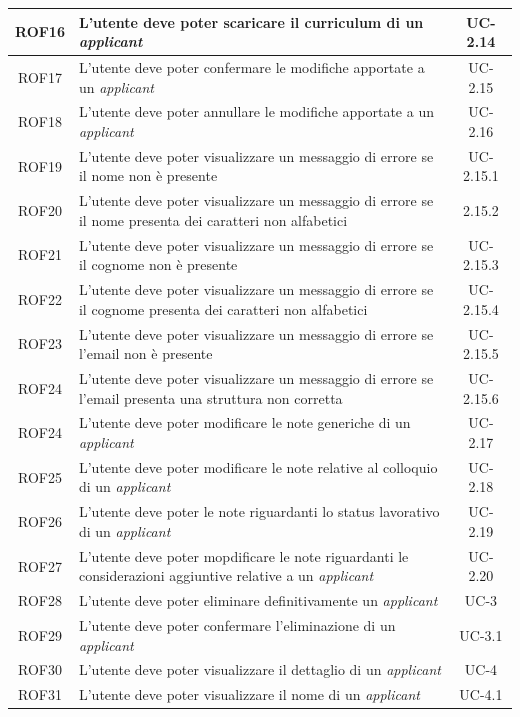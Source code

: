 \begin{center}
\begin{tabularx}{\textwidth}{|c|X|c|}
		\hline
		ROF16 & L'utente deve poter scaricare il curriculum di un \textit{applicant} & UC-2.14\\
		\hline
		ROF17 & L'utente deve poter confermare le modifiche apportate a un \textit{applicant} & UC-2.15 \\
		\hline
		ROF18 & L'utente deve poter annullare le modifiche apportate a un \textit{applicant} &  UC-2.16\\
		\hline
		ROF19 & L'utente deve poter visualizzare un messaggio di errore se il nome non è presente & UC-2.15.1 \\
		\hline
		ROF20 & L'utente deve poter visualizzare un messaggio di errore se il nome presenta dei caratteri non alfabetici & 2.15.2 \\
		\hline
		ROF21 & L'utente deve poter visualizzare un messaggio di errore se il cognome non è presente & UC-2.15.3 \\
		\hline
		ROF22 & L'utente deve poter visualizzare un messaggio di errore se il cognome presenta dei caratteri non alfabetici & UC-2.15.4\\
		\hline
		ROF23 & L'utente deve poter visualizzare un messaggio di errore se l'email non è presente & UC-2.15.5\\
		\hline
		ROF24 & L'utente deve poter visualizzare un messaggio di errore se l'email presenta una struttura non corretta & UC-2.15.6\\
		\hline
		ROF24 & L'utente deve poter modificare le note generiche di un \textit{applicant} & UC-2.17 \\
		\hline
		ROF25 & L'utente deve poter modificare le note relative al colloquio di un \textit{applicant} & UC-2.18 \\
		\hline
		ROF26 & L'utente deve poter le note riguardanti lo status lavorativo di un \textit{applicant} & UC-2.19\\
		\hline
		ROF27 & L'utente deve poter mopdificare le note riguardanti le considerazioni aggiuntive relative a un \textit{applicant} &  UC-2.20\\
		\hline
		ROF28 & L'utente deve poter eliminare definitivamente un \textit{applicant} & UC-3 \\
		\hline
		ROF29 & L'utente deve poter confermare l'eliminazione di un \textit{applicant} & UC-3.1 \\
		\hline
		ROF30 & L'utente deve poter visualizzare il dettaglio di un \textit{applicant} & UC-4 \\
		\hline
		ROF31 & L'utente deve poter visualizzare il nome di un \textit{applicant} & UC-4.1\\

\end{tabularx}
\end{center}
